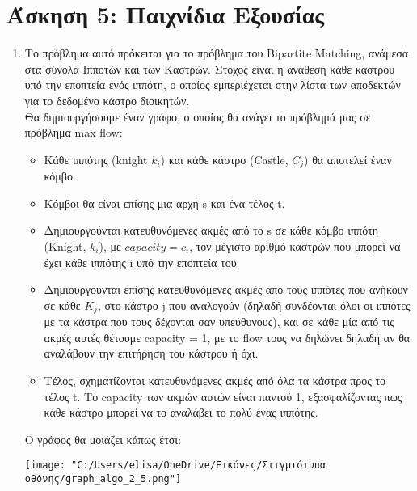 \documentclass{article}
\begin{document}
\section*{\large Άσκηση 5: Παιχνίδια Εξουσίας}
\begin{enumerate}
\item Το πρόβλημα αυτό πρόκειται για το πρόβλημα του Bipartite Matching, ανάμεσα στα σύνολα Ιπποτών και των Καστρών. Στόχος είναι η ανάθεση κάθε κάστρου υπό την εποπτεία ενός ιππότη, ο οποίος εμπεριέχεται στην λίστα των αποδεκτών για το δεδομένο κάστρο διοικητών. \\
Θα δημιουργήσουμε έναν γράφο, ο οποίος θα ανάγει το πρόβλημά μας σε πρόβλημα max flow:
\begin{itemize}
\item Κάθε ιππότης (knight $k_i$) και κάθε κάστρο (Castle, $C_j$) θα αποτελεί έναν κόμβο.
\item Κόμβοι θα είναι επίσης μια αρχή s και ένα τέλος t. 
\item Δημιουργούνται κατευθυνόμενες ακμές από το s σε κάθε κόμβο ιππότη (Knight, $k_i$),  με $capacity = c_i$, τον μέγιστο αριθμό καστρών που μπορεί να έχει κάθε ιππότης i υπό την εποπτεία του. 
\item Δημιουργούνται επίσης κατευθυνόμενες ακμές από τους ιππότες που ανήκουν σε κάθε $K_j$, στο κάστρο j που αναλογούν (δηλαδή συνδέονται όλοι οι ιππότες με τα κάστρα που τους δέχονται σαν υπεύθυνους), και σε κάθε μία από τις ακμές αυτές θέτουμε capacity = 1, με το flow τους να δηλώνει δηλαδή αν θα αναλάβουν την επιτήρηση του κάστρου ή όχι. 
\item Τέλος, σχηματίζονται κατευθυνόμενες ακμές από όλα τα κάστρα προς το τέλος t.  Το capacity των ακμών αυτών είναι παντού 1, εξασφαλίζοντας πως κάθε κάστρο μπορεί να το αναλάβει το πολύ ένας ιππότης. 
\end{itemize} 

Ο γράφος θα μοιάζει κάπως έτσι:
\\
\begin{minipage}{\textwidth}
 \centering
 \texttt{[image: "C:/Users/elisa/OneDrive/Εικόνες/Στιγμιότυπα οθόνης/graph\_algo\_2\_5.png"]}
\end{minipage}


\end{enumerate}
\end{document}
